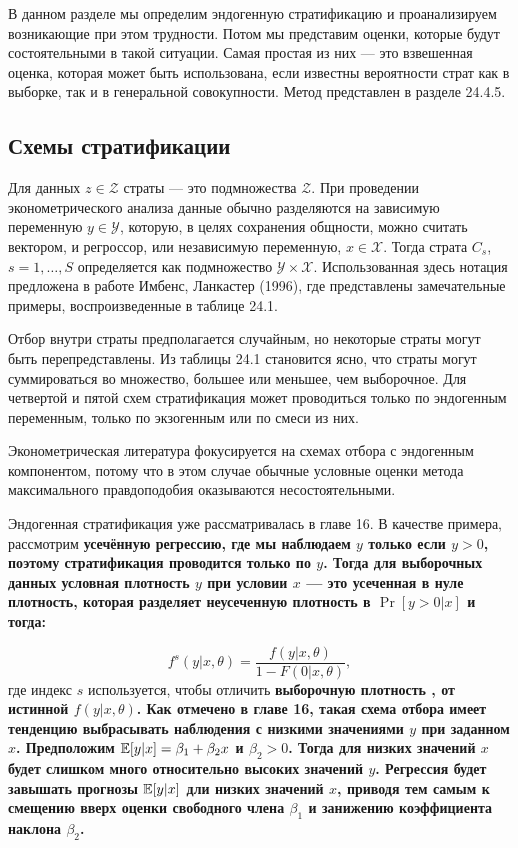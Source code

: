 В данном разделе мы определим эндогенную стратификацию и проанализируем возникающие при этом трудности. Потом мы представим оценки, которые будут состоятельными в такой ситуации. Самая простая из них --- это взвешенная оценка, которая может быть использована, если известны вероятности страт как в выборке, так и в генеральной совокупности. Метод представлен в разделе 24.4.5. 

\subsection{Схемы стратификации}

Для данных $z \in \mathcal Z$ страты --- это подмножества $\mathcal Z$. При проведении эконометрического анализа данные обычно разделяются на зависимую переменную $y \in \mathcal Y$, которую, в целях сохранения общности, можно считать вектором, и регроссор, или независимую переменную, $x \in \mathcal X$. Тогда страта $C_s$, $s=1, \dots ,S$ определяется как подмножество $ \mathcal Y \times \mathcal X$. Использованная здесь нотация предложена в работе Имбенс, Ланкастер (1996), где представлены замечательные примеры, воспроизведенные в таблице 24.1. 

Отбор внутри страты предполагается случайным, но некоторые страты могут быть перепредставлены. Из таблицы 24.1 становится ясно, что страты могут суммироваться во множество, большее или меньшее, чем выборочное. Для четвертой и пятой схем стратификация может проводиться только по эндогенным переменным, только по экзогенным или по смеси из них. 

Эконометрическая литература фокусируется на схемах отбора с эндогенным компонентом, потому что в этом случае обычные условные оценки метода максимального правдоподобия оказываются несостоятельными. 

Эндогенная стратификация уже рассматривалась в главе 16. В качестве примера, рассмотрим \bfseries усечённую регрессию\mdseries, где мы наблюдаем $y$ только если $y>0$, поэтому стратификация проводится только по $y$. Тогда для выборочных данных условная плотность $y$ при условии $x$ --- это усеченная в нуле плотность, которая разделяет неусеченную плотность в $\Pr[y > 0|x]$ и тогда:

$$
f^s(y|x,\theta) = \frac{f(y|x,\theta)}{1-F(0|x,\theta)},
$$
где индекс $s$ используется, чтобы отличить \bfseries выборочную плотность \mdseries, от истинной $f(y|x,\theta)$. Как отмечено в главе 16, такая схема отбора имеет тенденцию выбрасывать наблюдения с низкими значениями $y$ при заданном $x$. Предположим $\mathbb{E}[y|x] = \beta_1 + \beta_2 x$ и $\beta_2 > 0$. Тогда для низких значений $x$ будет слишком много относительно высоких значений $y$. Регрессия будет завышать прогнозы $\mathbb{E}[y|x]$ дли низких значений $x$, приводя тем самым к смещению вверх оценки свободного члена $\beta_1$ и занижению коэффициента наклона $\beta_2$. 
 

